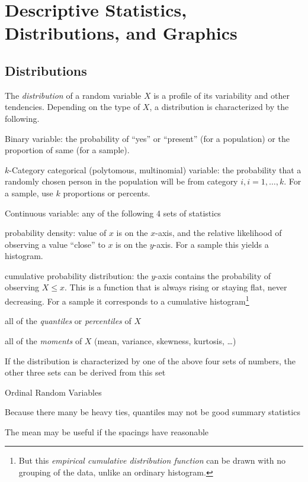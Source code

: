 

\chapter{Descriptive Statistics, Distributions, and Graphics}   
\section{Distributions} 
The \emph{distribution} of a random variable $X$ is a profile of its
variability and other tendencies.
Depending on the type of $X$, a distribution is
characterized by the following.
\bi
\item Binary variable: the probability of ``yes'' or ``present'' (for
  a population) or the proportion of same (for a sample). \\
\item $k$-Category categorical (polytomous, multinomial) variable: the probability that a randomly chosen
  person in the population will be from category $i, i=1,\ldots,k$.
  For a sample, use $k$ proportions or percents.
\item Continuous variable: any of the following 4 sets of statistics
 \bi
 \item probability density: value of $x$ is on the $x$-axis, and the
   relative likelihood of observing a value ``close'' to $x$ is on the
   $y$-axis.  For a sample this yields a histogram.
 \item cumulative probability distribution: the $y$-axis contains the
   probability of observing $X\leq x$.  This is a function that is
   always rising or staying flat, never decreasing.  For a sample it
   corresponds to a cumulative histogram\footnote{But this
     \emph{empirical cumulative distribution function} can be drawn
     with no grouping of the data, unlike an ordinary histogram.}
 \item all of the \emph{quantiles} or \emph{percentiles} of $X$
 \item all of the \emph{moments} of $X$ (mean, variance, skewness,
   kurtosis, \ldots)
 \item If the distribution is characterized by one of the above four
   sets of numbers, the other three sets can be derived from this set
\ei
\item Ordinal Random Variables
  \bi
  \item Because there many be heavy ties, quantiles may not be good
    summary statistics
  \item The mean may be useful if the spacings have reasonable
